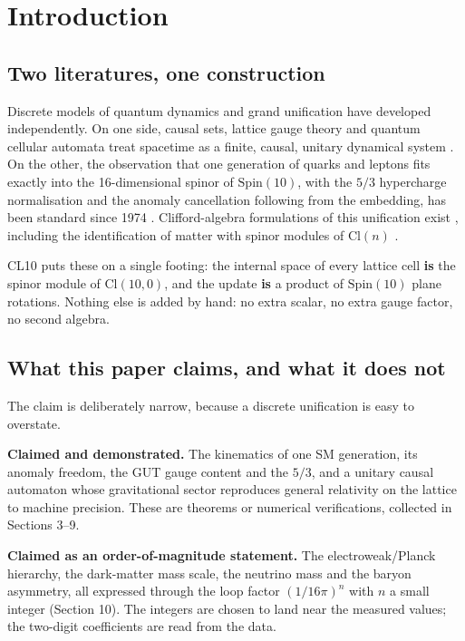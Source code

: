 \documentclass[aps,prd,twocolumn,amsmath,amssymb,superscriptaddress,nofootinbib,floatfix]{revtex4-2}
\begin{document}
\section{Introduction}\label{introduction}

\subsection{Two literatures, one
construction}\label{two-literatures-one-construction}

Discrete models of quantum dynamics and grand unification have developed
independently. On one side, causal sets, lattice gauge theory and
quantum cellular automata treat spacetime as a finite, causal, unitary
dynamical system \cite{ref01,ref02,ref03,ref04,ref05}. On the other, the
observation that one generation of quarks and leptons fits exactly into
the 16-dimensional spinor of \(\mathrm{Spin}(10)\), with the \(5/3\)
hypercharge normalisation and the anomaly cancellation following from
the embedding, has been standard since 1974
\cite{ref06,ref07,ref08,ref09}. Clifford-algebra formulations of this
unification exist \cite{ref10,ref11,ref12}, including the identification
of matter with spinor modules of \(\mathrm{Cl}(n)\) \cite{ref12}.

CL10 puts these on a single footing: the internal space of every lattice
cell \textbf{is} the spinor module of \(\mathrm{Cl}(10,0)\), and the
update \textbf{is} a product of \(\mathrm{Spin}(10)\) plane rotations.
Nothing else is added by hand: no extra scalar, no extra gauge factor,
no second algebra.

\subsection{What this paper claims, and what it does
not}\label{what-this-paper-claims-and-what-it-does-not}

The claim is deliberately narrow, because a discrete unification is easy
to overstate.

\textbf{Claimed and demonstrated.} The kinematics of one SM generation,
its anomaly freedom, the GUT gauge content and the \(5/3\), and a
unitary causal automaton whose gravitational sector reproduces general
relativity on the lattice to machine precision. These are theorems or
numerical verifications, collected in Sections 3--9.

\textbf{Claimed as an order-of-magnitude statement.} The
electroweak/Planck hierarchy, the dark-matter mass scale, the neutrino
mass and the baryon asymmetry, all expressed through the loop factor
\((1/16\pi)^{n}\) with \(n\) a small integer (Section 10). The integers
are chosen to land near the measured values; the two-digit coefficients
are read from the data.
\end{document}
